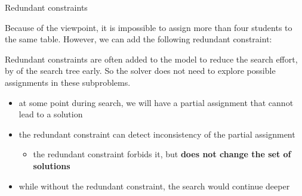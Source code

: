 \documentclass{cons-beamer}
\begin{document}
\begin{frame}{Redundant constraints}
  \begin{example}
    Because of the viewpoint, it is impossible to assign more than four students to the same table. However, we can add the following redundant constraint:

    
  \end{example}


  Redundant constraints are often added to the model to reduce the search effort, by  of the search tree early.
  So the solver does not need to explore possible assignments in these subproblems.

  \begin{itemize}
    \item at some point during search, we will have a partial
      assignment that cannot lead to a solution
    \item the redundant constraint can detect inconsistency of the
      partial assignment
      \begin{itemize}
        \item the redundant constraint forbids it, but \textbf{does
          not change the set of solutions}
      \end{itemize}
    \item while without the redundant constraint, the search would
      continue deeper
  \end{itemize}
\end{frame}
\end{document}
